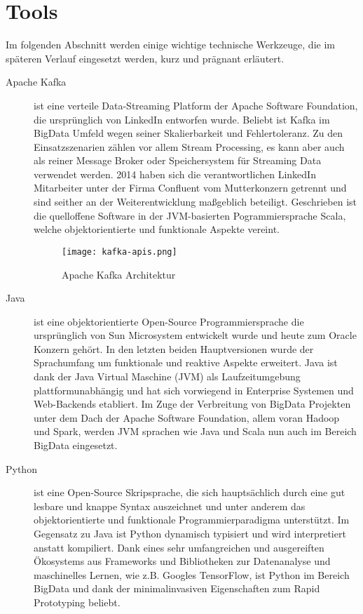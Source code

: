 \chapter{Tools}
\label{chap:tools}
Im folgenden Abschnitt werden einige wichtige technische Werkzeuge, die im späteren Verlauf eingesetzt werden, kurz und prägnant erläutert.

\begin{description}
	\item [Apache Kafka] ist eine verteile Data-Streaming Platform der Apache Software Foundation, die ursprünglich von LinkedIn entworfen wurde. Beliebt ist Kafka im BigData Umfeld wegen seiner Skalierbarkeit und Fehlertoleranz.  Zu den Einsatzszenarien zählen vor allem Stream Processing, es kann aber auch als reiner Message Broker oder Speichersystem für Streaming Data verwendet werden. 2014 haben sich die verantwortlichen LinkedIn Mitarbeiter unter der Firma Confluent vom Mutterkonzern getrennt und sind seither an der Weiterentwicklung maßgeblich beteiligt. 
	Geschrieben ist die quelloffene Software in der JVM-basierten Pogrammiersprache Scala, welche objektorientierte und funktionale Aspekte vereint.
	\begin{figure}[h]
		\centering
		\texttt{[image: kafka-apis.png]}
		\caption[Apache Kafka Architektur]{Apache Kafka Architektur\citep{TODO}}
		\label{fig:KafkaArchitecture}
	\end{figure}
	\item [Java] ist eine objektorientierte Open-Source Programmiersprache die ursprünglich von Sun Microsystem entwickelt wurde und heute zum Oracle Konzern gehört. In den letzten beiden Hauptversionen wurde der Sprachumfang  um funktionale und reaktive Aspekte erweitert. Java ist dank der Java Virtual Maschine (JVM) als Laufzeitumgebung plattformunabhängig und hat sich vorwiegend in Enterprise Systemen und Web-Backends etabliert. Im Zuge der Verbreitung von BigData Projekten unter dem Dach der Apache Software Foundation, allem voran Hadoop und Spark, werden JVM sprachen wie Java und Scala nun auch im Bereich BigData eingesetzt.
	\item [Python] ist eine Open-Source Skripsprache, die sich hauptsächlich durch eine gut lesbare und knappe Syntax auszeichnet und unter anderem das objektorientierte und funktionale Programmierparadigma unterstützt. Im Gegensatz zu Java ist Python dynamisch typisiert und wird interpretiert anstatt kompiliert. Dank eines sehr umfangreichen und ausgereiften Ökosystems aus Frameworks und Bibliotheken zur Datenanalyse und maschinelles Lernen, wie z.B. Googles TensorFlow, ist Python im Bereich BigData  und dank der minimalinvasiven Eigenschaften zum Rapid Prototyping beliebt.

\end{description}
